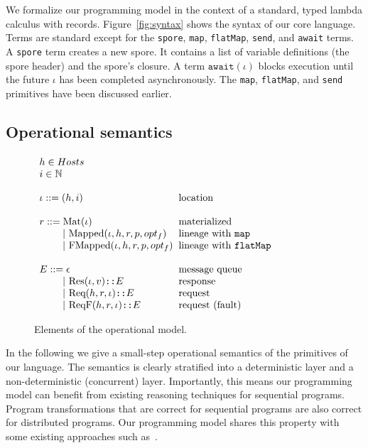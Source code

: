 \documentclass[preprint]{sigplanconf}
\theoremstyle{definition}
\theoremstyle{definition}
\newcommand{\gap}{\quad\quad}
\newcommand{\ba}{\begin{array}}
\newcommand{\ea}{\end{array}}
\begin{document}
We formalize our programming model in the context of a standard, typed lambda calculus with records. Figure~\ref{fig:syntax} shows the syntax of our core language. Terms are standard except for the \texttt{spore}, \texttt{map}, \texttt{flatMap}, \texttt{send}, and \texttt{await} terms. A \texttt{spore} term creates a new spore. It contains a list of variable definitions (the spore header) and the spore's closure. A term $\texttt{await}(\iota)$ blocks execution until the future $\iota$ has been completed asynchronously. The \texttt{map}, \texttt{flatMap}, and \texttt{send} primitives have been discussed earlier.


\subsection{Operational semantics}\label{sec:opsem}

\begin{figure}[ht!]
  \centering

  $\ba[t]{l@{\hspace{2mm}}l}
h \in Hosts &
\\
i \in \mathbb{N} &
\\
 & \\
\iota  ::=  (h, i)                               & \mbox{location}
\\
 & \\
r ::=     \text{Mat}(\iota) & \mbox{materialized}
\\
\gap ~|~  \text{Mapped}(\iota, h, r, p, opt_f)   & \mbox{lineage with \texttt{map}}
\\
\gap ~|~  \text{FMapped}(\iota, h, r, p, opt_f)  & \mbox{lineage with \texttt{flatMap}}
\\
 & \\
E      ::=  \epsilon & \mbox{message queue}
\\
\gap ~|~    \text{Res}(\iota, v) \texttt{::} E      & \mbox{response}
\\
\gap ~|~    \text{Req}(h, r, \iota) \texttt{::} E   & \mbox{request}
\\
\gap ~|~    \text{ReqF}(h, r, \iota) \texttt{::} E  & \mbox{request (fault)}
\\
  \ea$

  \vspace{1mm}
  \caption{Elements of the operational model.}
  \label{fig:elems-opsem}
  \vspace{1mm}
\end{figure}

In the following we give a small-step operational semantics of the primitives of our language. The semantics is clearly stratified into a deterministic layer and a non-deterministic (concurrent) layer. Importantly, this means our programming model can benefit from existing reasoning techniques for sequential programs. Program transformations that are correct for sequential programs are also correct for distributed programs. Our programming model shares this property with some existing approaches such as~\cite{ConcurrentHaskell}.
\end{document}
